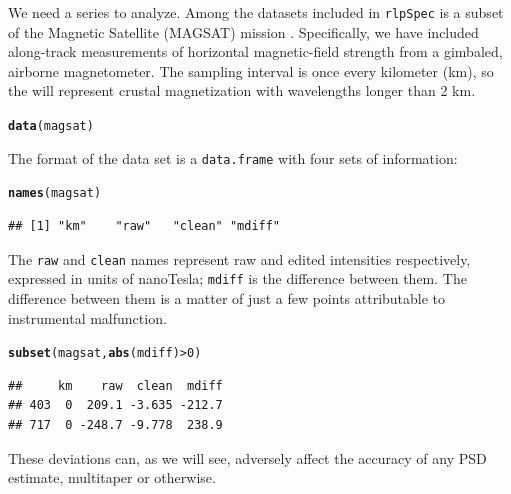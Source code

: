 \documentclass{article}\usepackage{graphicx, color}
\makeatletter
\newcommand{\hlfunctioncall}[1]{\textcolor[rgb]{0.501960784313725,0,0.329411764705882}{\textbf{#1}}}%
\newenvironment{kframe}{%
 \def\at@end@of@kframe{}%
 \ifinner\ifhmode%
  \def\at@end@of@kframe{\end{minipage}}%
  \begin{minipage}{\columnwidth}%
 \fi\fi%
 \def\FrameCommand##1{\hskip\@totalleftmargin \hskip-\fboxsep
 \colorbox{shadecolor}{##1}\hskip-\fboxsep
     \hskip-\linewidth \hskip-\@totalleftmargin \hskip\columnwidth}%
 \MakeFramed {\advance\hsize-\width
   \@totalleftmargin\z@ \linewidth\hsize
   \@setminipage}}%
 {\par\unskip\endMakeFramed%
 \at@end@of@kframe}
\newenvironment{knitrout}{}{} %
\newcommand{\Rcmd}[1]{\texttt{#1}}
\newcommand{\rlp}[0]{\Rcmd{rlpSpec}}
\makeatother
\begin{document}
We need a series to analyze.
Among the datasets included in \rlp{} is a subset of
the Magnetic Satellite (MAGSAT) mission \citep{langel1982}.
Specifically, we have included along-track measurements
of horizontal magnetic-field strength from a gimbaled, airborne magnetometer.
The sampling interval is
once every kilometer (km), so the will represent
crustal magnetization with wavelengths longer than 2 km.
\begin{knitrout}
\color{fgcolor}\begin{kframe}
\begin{alltt}
\hlfunctioncall{data}(magsat)
\end{alltt}
\end{kframe}
\end{knitrout}

The format of the data set is a \Rcmd{data.frame} with four
sets of information:
\begin{knitrout}
\color{fgcolor}\begin{kframe}
\begin{alltt}
\hlfunctioncall{names}(magsat)
\end{alltt}
\begin{verbatim}
## [1] "km"    "raw"   "clean" "mdiff"
\end{verbatim}
\end{kframe}
\end{knitrout}

The \Rcmd{raw} and \Rcmd{clean} names represent raw
and edited intensities respectively, expressed in units of nanoTesla; 
\Rcmd{mdiff} is the difference between them.
The difference between them is a matter of just a few points
attributable to instrumental malfunction. 
\begin{knitrout}
\color{fgcolor}\begin{kframe}
\begin{alltt}
\hlfunctioncall{subset}(magsat, \hlfunctioncall{abs}(mdiff) > 0)
\end{alltt}
\begin{verbatim}
##     km    raw  clean  mdiff
## 403  0  209.1 -3.635 -212.7
## 717  0 -248.7 -9.778  238.9
\end{verbatim}
\end{kframe}
\end{knitrout}

These deviations can,
as we will see, adversely affect the accuracy of any PSD estimate,
multitaper or otherwise.
\end{document}
